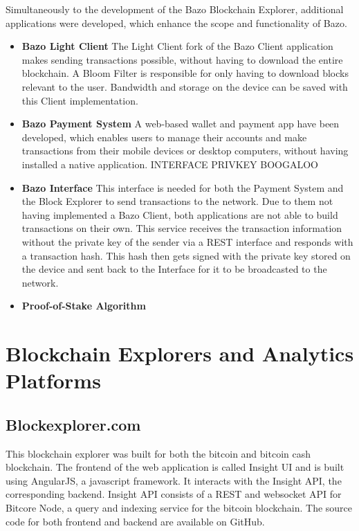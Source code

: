 Simultaneously to the development of the Bazo Blockchain Explorer, additional applications were developed, which enhance the scope and functionality of Bazo. 

\begin{itemize}
\item \textbf{Bazo Light Client}
The Light Client fork of the Bazo Client application makes sending transactions possible, without having to download the entire blockchain. A Bloom Filter is responsible for only having to download blocks relevant to the user. Bandwidth and storage on the device can be saved with this Client implementation.
\item \textbf{Bazo Payment System}
A web-based wallet and payment app have been developed, which enables users to manage their accounts and make transactions from their mobile devices or desktop computers, without having installed a native application. INTERFACE PRIVKEY BOOGALOO
\item \textbf{Bazo Interface}
This interface is needed for both the Payment System and the Block Explorer to send transactions to the network. Due to them not having implemented a Bazo Client, both applications are not able to build transactions on their own. This service receives the transaction information without the private key of the sender via a REST interface and responds with a transaction hash. This hash then gets signed with the private key stored on the device and sent back to the Interface for it to be broadcasted to the network.
\item \textbf{Proof-of-Stake Algorithm}

\end{itemize}

\section{Blockchain Explorers and Analytics Platforms}
\subsection{Blockexplorer.com}
This blockchain explorer was built for both the bitcoin and bitcoin cash blockchain. The frontend of the web application is called Insight UI and is built using AngularJS, a javascript framework. It interacts with the Insight API, the corresponding backend. Insight API consists of a REST and websocket API for Bitcore Node, a query and indexing service for the bitcoin blockchain. The source code for both frontend and backend are available on GitHub.


